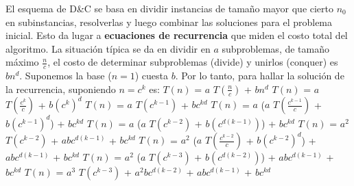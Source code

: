 \documentclass[10pt,a4paper]{article}
\begin{document}
El esquema de D\&C se basa en dividir instancias de tamaño mayor que cierto $n_{0}$ en subinstancias, resolverlas y luego combinar las soluciones para el problema inicial.
\newline
\newline
Esto da lugar a \textbf{ecuaciones de recurrencia} que miden el costo total del algoritmo. La situación típica se da en dividir en $a$ subproblemas, de tamaño máximo $\displaystyle \frac{n}{c}$, el costo de determinar subproblemas (divide) y unirlos (conquer) es $bn^{d}$. Suponemos la base ($n=1$) cuesta $b$.  
\newline
\newline
Por lo tanto, para hallar la solución de la recurrencia, suponiendo $n = c^{k}$ es:
\newline
\newline
$T(n)$ = $a$ $T(\displaystyle \frac{n}{c})$ + $bn^{d}$
\newline
\newline
\newline
$T(n)$ = $a$ $T(\displaystyle \frac{c^{k}}{c})$ + $b(c^{k})^{d}$
\newline
\newline
\newline
$T(n)$ = $a$ $T(c^{k-1})$ + $bc^{kd}$
\newline
\newline
\newline
$T(n)$ = $a$ ($a$ $T(\displaystyle \frac{c^{k-1}}{c})$ + $b(c^{k-1})^{d}$) + $bc^{kd}$
\newline
\newline
\newline
$T(n)$ = $a$ ($a$ $T(c^{k-2})$ + $b(c^{d(k-1)})$) + $bc^{kd}$
\newline
\newline
\newline
$T(n)$ = $a^{2}$ $T(c^{k-2})$ + $abc^{d(k-1)}$ + $bc^{kd}$
\newline
\newline
\newline
$T(n)$ = $a^{2}$ ($a$ $T(\displaystyle \frac{c^{k-2}}{c})$ + $b(c^{k-2})^{d}$) + $abc^{d(k-1)}$ + $bc^{kd}$
\newline
\newline
\newline
$T(n)$ = $a^{2}$ ($a$ $T(c^{k-3})$ + $b(c^{d(k-2)})$) + $abc^{d(k-1)}$ + $bc^{kd}$
\newline
\newline
\newline
$T(n)$ = $a^{3}$ $T(c^{k-3})$ + $a^{2}bc^{d(k-2)}$ + $abc^{d(k-1)}$ + $bc^{kd}$
\end{document}
